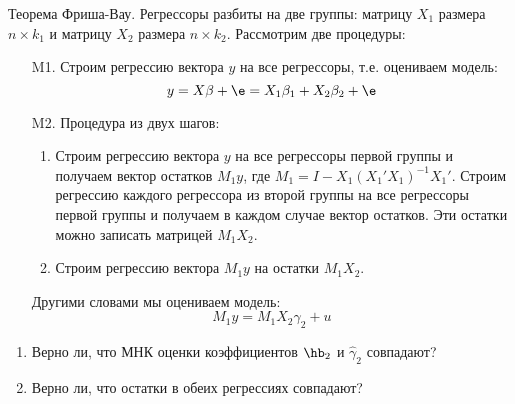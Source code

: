 \documentclass[pdftex,11pt,openany]{book}\usepackage[]{graphicx}\usepackage[]{color}
\begin{document}
\begin{problem}
Теорема Фриша-Вау. Регрессоры разбиты на две группы: матрицу $X_1$ размера $n\times k_1$ и матрицу $X_2$ размера $n\times k_2$. Рассмотрим две процедуры:
\begin{enumerate}
\item[M1.] Строим регрессию вектора $y$ на все регрессоры, т.е. оцениваем модель:
\[ 
y=X\beta + \e = X_1 \beta_1 + X_2 \beta_2 +\e 
\]
\item[M2.] Процедура из двух шагов:
\begin{enumerate}
\item Строим регрессию вектора $y$ на все регрессоры первой группы и получаем вектор остатков $M_1 y$, где $M_1=I-X_1(X_1'X_1)^{-1}X_1'$. Строим регрессию каждого регрессора из второй группы на все регрессоры первой группы и получаем в каждом случае вектор остатков. Эти остатки можно записать матрицей $M_1 X_2$. 
\item Строим регрессию вектора $M_1 y$ на остатки $M_1 X_2$.
\end{enumerate}
Другими словами мы оцениваем модель:
\[
M_1 y = M_1 X_2 \gamma_2 + u
\]

\end{enumerate}
\begin{enumerate}
\item Верно ли, что МНК оценки коэффициентов $\hb_2$ и $\hat{\gamma}_2$ совпадают?
\item Верно ли, что остатки в обеих регрессиях совпадают?
\end{enumerate}
\end{problem}
\end{document}
